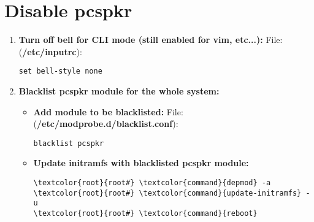 \documentclass[10pt, a4paper, onecolumn, openany]{book} %
\begin{document}
\section{Disable pcspkr}
\begin{enumerate}
    \item \textbf{Turn off bell for CLI mode (still enabled for vim, etc...):}
\newline File: (\textbf{\textcolor{file}{/etc/inputrc}}):
\begin{Verbatim}[commandchars=\\\{\}]
set bell-style none
\end{Verbatim}
    \item \textbf{Blacklist pcspkr module for the whole system:}
    \begin{itemize}
        \item \textbf{Add module to be blacklisted:}
\newline File: (\textbf{\textcolor{file}{/etc/modprobe.d/blacklist.conf}}):
\begin{Verbatim}[commandchars=\\\{\}]
blacklist pcspkr
\end{Verbatim}
        \item \textbf{Update initramfs with blacklisted pcspkr module:}
\begin{Verbatim}[commandchars=\\\{\}]
\textcolor{root}{root#} \textcolor{command}{depmod} -a
\textcolor{root}{root#} \textcolor{command}{update-initramfs} -u
\textcolor{root}{root#} \textcolor{command}{reboot}
\end{Verbatim}
    \end{itemize}
\end{enumerate}
\end{document}
